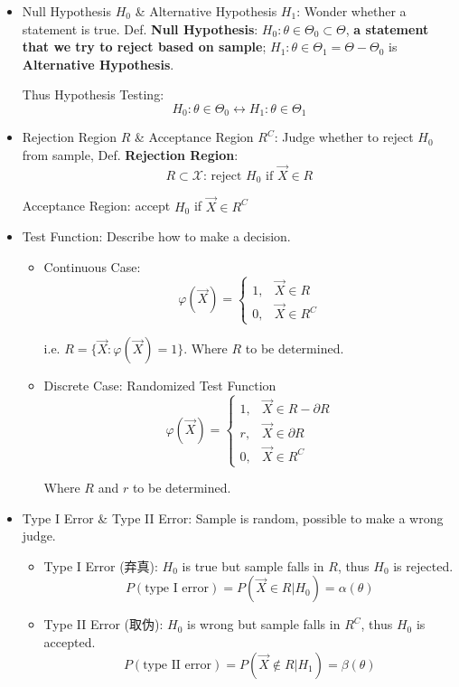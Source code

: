     \begin{itemize}[topsep = -3 pt]
        \item Null Hypothesis $H_0$ \& Alternative Hypothesis $H_1$: Wonder whether a statement is true. Def. \textbf{Null Hypothesis}: $H_0:\theta\in\Theta_0\subset\Theta$, \textbf{a statement that we try to reject based on sample}; $H_1:\theta\in\Theta_1=\Theta-\Theta_0$ is \textbf{Alternative Hypothesis}.
        
        Thus Hypothesis Testing:
        \[
            H_0:\theta\in\Theta_0\longleftrightarrow H_1:\theta\in\Theta_1
        \]
        
        \item Rejection Region $R$ \& Acceptance Region $R^C$: Judge whether to reject $H_0$ from sample, Def. \textbf{Rejection Region}:
        \[R\subset\mathscr{X}\text{: reject } H_0 \text{ if } \vec{X}\in R\]

        Acceptance Region: accept $H_0$ if $\vec{X}\in R^C$
        \item Test Function: Describe how to make a decision.
        \begin{itemize}
            \item Continuous Case:
        \[
            \varphi(\vec{X})=\begin{cases}
                1,&\vec{X}\in R\\
                0,&\vec{X}\in R^C
            \end{cases}
        \]

        i.e. $R=\{\vec{X}:\varphi(\vec{X})=1\}$. Where $R$ to be determined.

        \item Discrete Case: Randomized Test Function
        \[
        \varphi(\vec{X})=\begin{cases}
            1,&\vec{X}\in R-\partial R\\
            r,&\vec{X}\in \partial R\\
            0,&\vec{X}\in R^C
        \end{cases}    
        \]

        Where $R$ and $r$  to be determined.
    \end{itemize}
        \item Type I Error \& Type II Error: Sample is random, possible to make a wrong judge.
            
        \begin{itemize}[topsep = -4 pt]
            \item Type I Error (弃真): $H_0$ is true but sample falls in $R$, thus $H_0$ is rejected.
            \[P(\text{type I error})=P(\vec{X}\in R|H_0)=\alpha(\theta)\]
            \item Type II Error (取伪): $H_0$ is wrong but sample falls in $R^C$, thus $H_0$ is accepted.
            \[P(\text{type II error})=P(\vec{X}\notin R|H_1)=\beta(\theta)\]
        \end{itemize}


\end{itemize}
